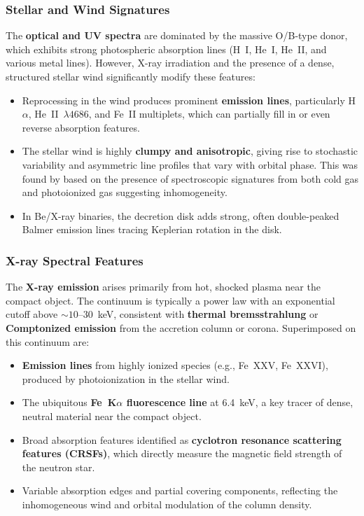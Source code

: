 \subsubsection{Stellar and Wind Signatures}

The \textbf{optical and UV spectra} are dominated by the massive O/B-type donor, which exhibits strong photospheric absorption lines (H~I, He~I, He~II, and various metal lines). However, X-ray irradiation and the presence of a dense, structured stellar wind significantly modify these features:
\begin{itemize}
    \item Reprocessing in the wind produces prominent \textbf{emission lines}, particularly H$\alpha$, He~II~$\lambda4686$, and Fe~II multiplets, which can partially fill in or even reverse absorption features.
    \item The stellar wind is highly \textbf{clumpy and anisotropic}, giving rise to stochastic variability and asymmetric line profiles that vary with orbital phase. This was found by \citet{1999ApJ...525..921S} based on the presence of spectroscopic signatures from both cold gas and photoionized gas suggesting inhomogeneity.
    \item In Be/X-ray binaries, the decretion disk adds strong, often double-peaked Balmer emission lines tracing Keplerian rotation in the disk.
\end{itemize}

\subsubsection{X-ray Spectral Features}

The \textbf{X-ray emission} arises primarily from hot, shocked plasma near the compact object. The continuum is typically a power law with an exponential cutoff above $\sim 10$--$30$~keV, consistent with \textbf{thermal bremsstrahlung} or \textbf{Comptonized emission} from the accretion column or corona. Superimposed on this continuum are:
\begin{itemize}
    \item \textbf{Emission lines} from highly ionized species (e.g., Fe~XXV, Fe~XXVI), produced by photoionization in the stellar wind.
    \item The ubiquitous \textbf{Fe~K$\alpha$ fluorescence line} at 6.4~keV, a key tracer of dense, neutral material near the compact object.
    \item Broad absorption features identified as \textbf{cyclotron resonance scattering features (CRSFs)}, which directly measure the magnetic field strength of the neutron star.
    \item Variable absorption edges and partial covering components, reflecting the inhomogeneous wind and orbital modulation of the column density.
\end{itemize}

